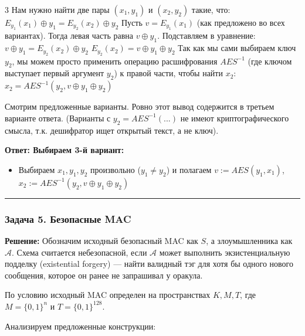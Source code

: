 ﻿\documentclass[9pt,a4paper,landscape]{extarticle}
\newcommand{\tightlist}{}
\begin{document}
\begin{multicols*}{3}
Нам нужно найти две пары \((x_1, y_1)\) и \((x_2, y_2)\) такие, что: \(E_{y_1}(x_1) \oplus y_1 = E_{y_2}(x_2) \oplus y_2\) Пусть \(v = E_{y_1}(x_1)\) (как предложено во всех вариантах). Тогда левая часть равна \(v \oplus y_1\). Подставляем в уравнение: \(v \oplus y_1 = E_{y_2}(x_2) \oplus y_2\) \(E_{y_2}(x_2) = v \oplus y_1 \oplus y_2\) Так как мы сами выбираем ключ \(y_2\), мы можем просто применить операцию расшифрования \(AES^{-1}\) (где ключом выступает первый аргумент \(y_2\)) к правой части, чтобы найти \(x_2\): \(x_2 = AES^{-1}(y_2, v \oplus y_1 \oplus y_2)\)

Смотрим предложенные варианты. Ровно этот вывод содержится в третьем варианте ответа. (Варианты с \(y_2 = AES^{-1}(...)\) не имеют криптографического смысла, т.к. дешифратор ищет открытый текст, а не ключ).

\textbf{Ответ: Выбираем 3-й вариант:}

\begin{itemize}
\tightlist
\item
  Выбираем \(x_1, y_1, y_2\) произвольно (\(y_1 \neq y_2\)) и полагаем \(v := AES(y_1, x_1)\), \(x_2 := AES^{-1}(y_2, v \oplus y_1 \oplus y_2)\)
\end{itemize}

\begin{center}\rule{0.5\linewidth}{0.5pt}\end{center}

\subsubsection{Задача 5. Безопасные MAC}\label{ux437ux430ux434ux430ux447ux430-5.-ux431ux435ux437ux43eux43fux430ux441ux43dux44bux435-mac}

\textbf{Решение:} Обозначим исходный безопасный MAC как \(S\), а злоумышленника как \(\mathcal{A}\). Схема считается небезопасной, если \(\mathcal{A}\) может выполнить экзистенциальную подделку (existential forgery) --- найти валидный тэг для хотя бы одного нового сообщения, которое он ранее не запрашивал у оракула.

По условию исходный MAC определен на пространствах \(K, M, T\), где \(M=\{0,1\}^n\) и \(T=\{0,1\}^{128}\).

Анализируем предложенные конструкции:


\end{multicols*}
\end{document}
